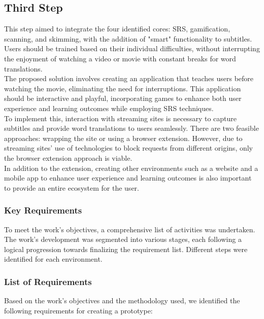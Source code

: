 \documentclass[12pt]{article}
\begin{document}
\subsection{Third Step}

This step aimed to integrate the four identified cores: SRS, gamification, scanning, and skimming, with the addition of "smart" functionality to subtitles. Users should be trained based on their individual difficulties, without interrupting the enjoyment of watching a video or movie with constant breaks for word translations. \\ 
The proposed solution involves creating an application that teaches users before watching the movie, eliminating the need for interruptions. This application should be interactive and playful, incorporating games to enhance both user experience and learning outcomes while employing SRS techniques.\\ 
To implement this, interaction with streaming sites is necessary to capture subtitles and provide word translations to users seamlessly. There are two feasible approaches: wrapping the site or using a browser extension. However, due to streaming sites' use of technologies to block requests from different origins, only the browser extension approach is viable.\\
In addition to the extension, creating other environments such as a website and a mobile app to enhance user experience and learning outcomes is also important to provide an entire ecosystem for the user. 

\subsubsection{Key Requirements}

To meet the work's objectives, a comprehensive list of activities was undertaken. The work's development was segmented into various stages, each following a logical progression towards finalizing the requirement list. Different steps were identified for each environment.

\subsubsection{List of Requirements}

Based on the work's objectives and the methodology used, we identified the following requirements for creating a prototype:
\end{document}
